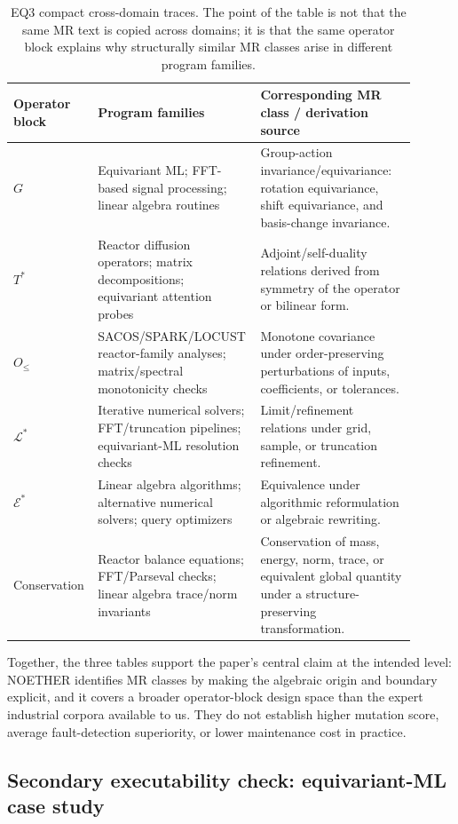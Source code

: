 \documentclass[manuscript]{acmart}
\begin{document}
\begin{table}[h]
\centering
\caption{EQ3 compact cross-domain traces. The point of the table is not that
the same MR text is copied across domains; it is that the same operator block
explains why structurally similar MR classes arise in different program
families.}
\label{tab:cross-domain-trace}
\small
\begin{tabular}{p{0.18\linewidth}p{0.34\linewidth}p{0.38\linewidth}}
\toprule
Operator block & Program families & Corresponding MR class / derivation source \\
\midrule
$G$ & Equivariant ML; FFT-based signal processing; linear algebra routines &
Group-action invariance/equivariance: rotation equivariance, shift equivariance,
and basis-change invariance. \\
$T^{*}$ & Reactor diffusion operators; matrix decompositions; equivariant
attention probes & Adjoint/self-duality relations derived from symmetry of the
operator or bilinear form. \\
$O_{\le}$ & SACOS/SPARK/LOCUST reactor-family analyses; matrix/spectral
monotonicity checks & Monotone covariance under order-preserving perturbations
of inputs, coefficients, or tolerances. \\
$\mathcal{L}^{*}$ & Iterative numerical solvers; FFT/truncation pipelines;
equivariant-ML resolution checks & Limit/refinement relations under grid,
sample, or truncation refinement. \\
$\mathcal{E}^{*}$ & Linear algebra algorithms; alternative numerical solvers;
query optimizers & Equivalence under algorithmic reformulation or algebraic
rewriting. \\
Conservation & Reactor balance equations; FFT/Parseval checks; linear algebra
trace/norm invariants & Conservation of mass, energy, norm, trace, or equivalent
global quantity under a structure-preserving transformation. \\
\bottomrule
\end{tabular}
\end{table}

Together, the three tables support the paper's central claim at the intended
level: NOETHER identifies MR classes by making the algebraic origin and boundary
explicit, and it covers a broader operator-block design space than the expert
industrial corpora available to us. They do not establish higher mutation score,
average fault-detection superiority, or lower maintenance cost in practice.

\subsection{Secondary executability check: equivariant-ML case study}
\label{subsec:case-study}
\end{document}
